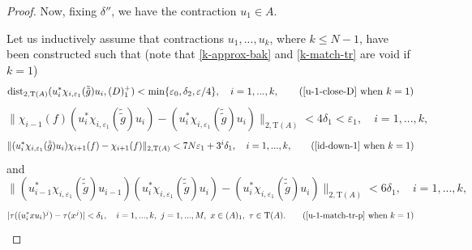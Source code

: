 \documentclass[12pt, oneside, psamsfonts]{amsart}
\theoremstyle{definition}
\theoremstyle{remark}
\numberwithin{equation}{section}
\newcommand{\norm}[1]{\| #1\|}
\newcommand{\abs}[1]{| #1 |}
\newcommand{\eps}{\varepsilon}
\newcommand{\tr}{\mathrm{T}}
\begin{document}
\begin{proof}
Now, fixing $\delta''$, we have the contraction $u_1 \in A$.

Let us inductively assume that contractions $u_1, ..., u_k$, where $k \leq N-1$, have been constructed such that (note that \eqref{k-approx-bak} and \eqref{k-match-tr} are void if $k=1$)
\begin{equation}\label{k-approx-close-D}
\mathrm{dist}_{2, \tr(A)}(u_i^*\chi_{i, \eps_1}(\tilde{\tilde{g}}) u_i, (D)^+_1) < \min\{\eps_0, \delta_2, \eps/4\},\quad i=1, ..., k, \quad \quad \textrm{(\eqref{u-1-close-D} when $k=1$)}
\end{equation}
\begin{equation}\label{k-approx-bak}
 \norm{ \chi_{i-1}(f) (u_{i}^* \chi_{i, \eps_1}(\tilde{\tilde{g}}) u_{i}) - (u_{i}^* \chi_{i, \eps_1}(\tilde{\tilde{g}}) u_{i}) }_{2, \tr(A)} < 4 \delta_1 < \eps_1,\quad i=1, ..., k,
\end{equation}
\begin{equation}\label{k-approx-for}
\norm{ (u_{i}^* \chi_{i, \eps_1}(\tilde{\tilde{g}}) u_{i}) \chi_{i+1}(f) - \chi_{i+1}(f) }_{2, \tr(A)} < 7 N \eps_1 + 3^i\delta_1,\quad i=1, ..., k, \quad \quad \textrm{(\eqref{id-down-1} when $k=1$)}
\end{equation}
and
\begin{equation}\label{k-match-tr}
\norm{ (u_{i-1}^* \chi_{i, \eps_1}(\tilde{\tilde{g}}) u_{i-1})(u_{i}^* \chi_{i, \eps_1}(\tilde{\tilde{g}}) u_{i}) - (u_{i}^* \chi_{i, \eps_1}(\tilde{\tilde{g}}) u_{i}) }_{2, \tr(A)} < 6\delta_1,\quad i=1, ..., k, 
\end{equation}
\begin{equation}\label{k-match-tr-p}
\abs{\tau((u_i^* x u_i)^j) - \tau(x^j)} < \delta_1,\quad i =1, ..., k,\ j=1, ..., M,\  x\in (A)_1,\ \tau \in \tr(A). \quad \quad \textrm{(\eqref{u-1-match-tr-p} when $k=1$)} 
\end{equation}


\end{proof}
\end{document}
